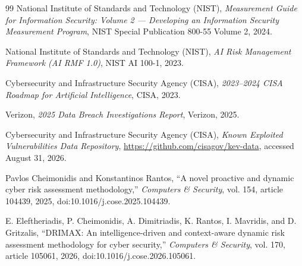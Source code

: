 \documentclass[11pt]{article}
\begin{document}
\begin{thebibliography}{99}
  National Institute of Standards and Technology (NIST),
  \emph{Measurement Guide for Information Security: Volume 2 --- Developing an Information Security Measurement Program},
  NIST Special Publication 800-55 Volume 2, 2024.

  National Institute of Standards and Technology (NIST),
  \emph{AI Risk Management Framework (AI RMF 1.0)},
  NIST AI 100-1, 2023.

  Cybersecurity and Infrastructure Security Agency (CISA),
  \emph{2023--2024 CISA Roadmap for Artificial Intelligence},
  CISA, 2023.

  Verizon,
  \emph{2025 Data Breach Investigations Report},
  Verizon, 2025.


  Cybersecurity and Infrastructure Security Agency (CISA),
  \emph{Known Exploited Vulnerabilities Data Repository},
  \url{https://github.com/cisagov/kev-data}, accessed August 31, 2026.

  Pavlos Cheimonidis and Konstantinos Rantos,
  ``A novel proactive and dynamic cyber risk assessment methodology,''
  \emph{Computers \& Security}, vol. 154, article 104439, 2025,
  doi:10.1016/j.cose.2025.104439.

  E. Eleftheriadis, P. Cheimonidis, A. Dimitriadis, K. Rantos, I. Mavridis, and D. Gritzalis,
  ``DRIMAX: An intelligence-driven and context-aware dynamic risk assessment methodology for cyber security,''
  \emph{Computers \& Security}, vol. 170, article 105061, 2026,
  doi:10.1016/j.cose.2026.105061.

\end{thebibliography}
\end{document}
